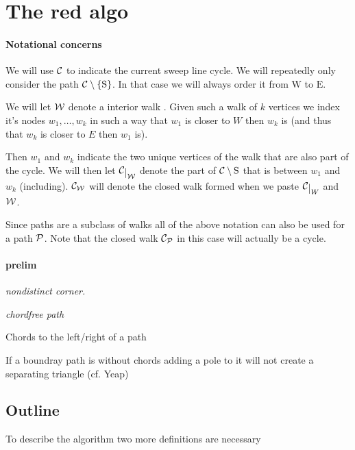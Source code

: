 \newcommand{\mrN}{\mathrm{N}}
\newcommand{\mrS}{\mathrm{S}}
\newcommand{\mrE}{\mathrm{E}}
\newcommand{\mrW}{\mathrm{W}}


\section{The red algo}
\paragraph{Notational concerns}
We will use $\C$ to indicate the current sweep line cycle.
We will repeatedly only consider the path $\cpath$. In that case we will always order it from $\mrW$ to $\mrE$.

We will let $\W$ denote a interior walk  . Given such a walk of $k$ vertices we index it's nodes $w_1, \ldots, w_k$  in such a way that $w_1$ is closer to $W$ then $w_k$ is (and thus that $w_k$ is closer to $E$ then $w_1$ is).

Then $w_1$ and $w_k$ indicate the two unique vertices of the walk that are also part of the cycle. We will then let $\restC{\W}$ denote the part of $\C\setminus {\mathrm{S}}$ that is between $w_1$ and $w_k$ (including). $\C_\W$ will denote the closed walk formed when we paste $\restC{W}$ and $\W$.

Since paths are a subclass of walks all of the above notation can also be used for a path $\P$. Note that the closed walk $\C_\P$ in this case will actually be a cycle.


\paragraph{prelim}
\emph{nondistinct corner.}

\emph{chordfree path}

Chords to the left/right of a path

\begin{lemma}
If a boundray path is without chords adding a pole to it will not create a separating triangle (cf. Yeap)
\end{lemma}

\subsection{Outline}
To describe the algorithm two  more definitions are necessary

